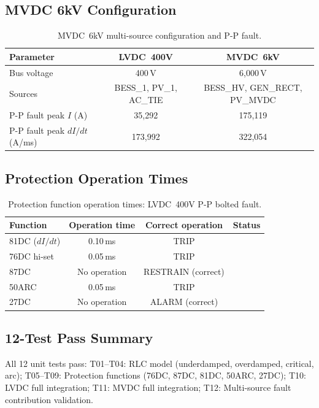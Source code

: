 \documentclass[11pt, a4paper]{article}
\newcommand{\cmark}{\ding{51}}
\begin{document}
\subsection{MVDC 6kV Configuration}

\begin{table}[ht]
\centering
\caption{MVDC~6kV multi-source configuration and P-P fault.}
\label{tab:mvdc}
\begin{tabular}{lcc}
\toprule
Parameter & LVDC~400V & MVDC~6kV \\
\midrule
Bus voltage & 400\,V & 6{,}000\,V \\
Sources & BESS\_1, PV\_1, AC\_TIE & BESS\_HV, GEN\_RECT, PV\_MVDC \\
P-P fault peak $I$ (A) & 35{,}292 & 175{,}119 \\
P-P fault peak $dI/dt$ (A/ms) & 173{,}992 & 322{,}054 \\
\bottomrule
\end{tabular}
\end{table}

\subsection{Protection Operation Times}

\begin{table}[ht]
\centering
\caption{Protection function operation times: LVDC~400V P-P bolted fault.}
\label{tab:prot_times}
\begin{tabular}{lccc}
\toprule
Function & Operation time & Correct operation & Status \\
\midrule
81DC ($dI/dt$)    & 0.10\,ms & TRIP & \cmark \\
76DC hi-set       & 0.05\,ms & TRIP & \cmark \\
87DC              & No operation & RESTRAIN (correct) & \cmark \\
50ARC             & 0.05\,ms & TRIP & \cmark \\
27DC              & No operation & ALARM (correct)   & \cmark \\
\bottomrule
\end{tabular}
\end{table}

\subsection{12-Test Pass Summary}

All 12 unit tests pass:
T01--T04: RLC model (underdamped, overdamped, critical, arc);
T05--T09: Protection functions (76DC, 87DC, 81DC, 50ARC, 27DC);
T10: LVDC full integration;
T11: MVDC full integration;
T12: Multi-source fault contribution validation.
\end{document}
